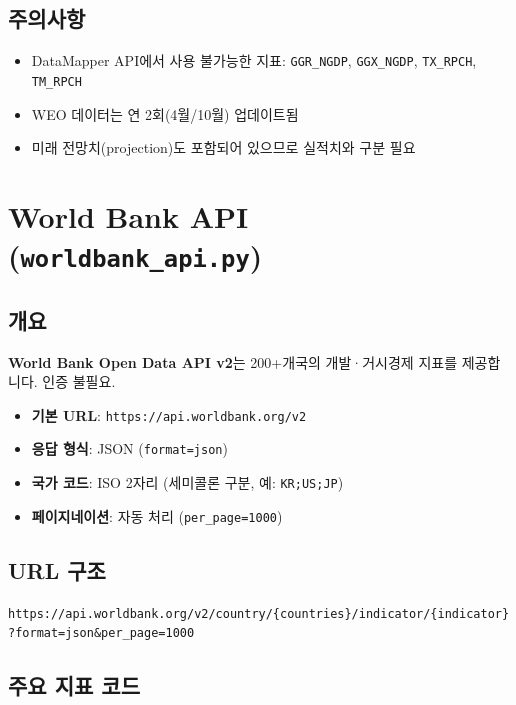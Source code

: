 \documentclass[11pt,a4paper]{article}
\newcommand{\apibox}[1]{%
    \noindent\colorbox{lightaccent}{\parbox{\dimexpr\textwidth-2\fboxsep}{%
        \small\texttt{#1}%
    }}%
    \vspace{0.5em}%
}
\newcommand{\code}[1]{\texttt{#1}}
\newcommand{\file}[1]{\texttt{\textcolor{string}{#1}}}
\begin{document}
\subsection{주의사항}

\begin{itemize}[leftmargin=2em]
    \item DataMapper API에서 사용 불가능한 지표: \code{GGR\_NGDP}, \code{GGX\_NGDP}, \code{TX\_RPCH}, \code{TM\_RPCH}
    \item WEO 데이터는 연 2회(4월/10월) 업데이트됨
    \item 미래 전망치(projection)도 포함되어 있으므로 실적치와 구분 필요
\end{itemize}


\section{World Bank API (\file{worldbank\_api.py})}

\subsection{개요}

\textbf{World Bank Open Data API v2}는 200+개국의 개발·거시경제 지표를 제공합니다.
인증 불필요.

\begin{itemize}[leftmargin=2em]
    \item \textbf{기본 URL}: \code{https://api.worldbank.org/v2}
    \item \textbf{응답 형식}: JSON (\code{format=json})
    \item \textbf{국가 코드}: ISO 2자리 (세미콜론 구분, 예: \code{KR;US;JP})
    \item \textbf{페이지네이션}: 자동 처리 (\code{per\_page=1000})
\end{itemize}

\subsection{URL 구조}

\apibox{https://api.worldbank.org/v2/country/\{countries\}/indicator/\{indicator\}?format=json\&per\_page=1000}

\subsection{주요 지표 코드}
\end{document}
